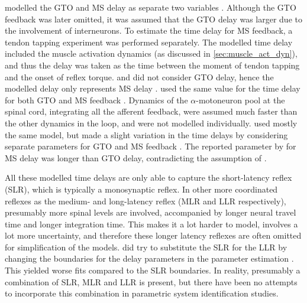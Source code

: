 \citeauthor{zhang_simultaneous_1997} modelled the GTO and MS delay as separate two variables \cite{zhang_simultaneous_1997}. Although the GTO feedback was later omitted, it was assumed that the GTO delay was larger due to the involvement of interneurons. To estimate the time delay for MS feedback, a tendon tapping experiment was performed separately. The modelled time delay included the muscle activation dynamics (as discussed in \autoref{sec:muscle_act_dyn}), and thus the delay was taken as the time between the moment of tendon tapping and the onset of reflex torque. \citeauthor{mirbagheri_intrinsic_2000} and \citeauthor{van_der_helm_identification_2002} did not consider GTO delay, hence the modelled delay only represents MS delay \cite{mirbagheri_intrinsic_2000, van_der_helm_identification_2002}. \citeauthor{schouten_nmclab_2008} used the same value for the time delay for both GTO and MS feedback \cite{schouten_nmclab_2008}. Dynamics of the $\alpha$-motoneuron pool at the spinal cord, integrating all the afferent feedback, were assumed much faster than the other dynamics in the loop, and were not modelled individually. \citeauthor{mugge_rigorous_2010} used mostly the same model, but made a slight variation in the time delays by considering separate parameters for GTO and MS feedback \cite{mugge_rigorous_2010}. The reported parameter by \citeauthor{mugge_rigorous_2010} for MS delay was longer than GTO delay, contradicting the assumption of \citeauthor{zhang_simultaneous_1997}. 

All these modelled time delays are only able to capture the short-latency reflex (SLR), which is typically a monosynaptic reflex. In other more coordinated reflexes as the medium- and long-latency reflex (MLR and LLR respectively), presumably more spinal levels are involved, accompanied by longer neural travel time and longer integration time. This makes it a lot harder to model, involves a lot more uncertainty, and therefore these longer latency reflexes are often omitted for simplification of the models. \citeauthor{mugge_rigorous_2010} did try to substitute the SLR for the LLR by changing the boundaries for the delay parameters in the parameter estimation \cite{mugge_rigorous_2010}. This yielded worse fits compared to the SLR boundaries. In reality, presumably a combination of SLR, MLR and LLR is present, but there have been no attempts to incorporate this combination in parametric system identification studies. 

